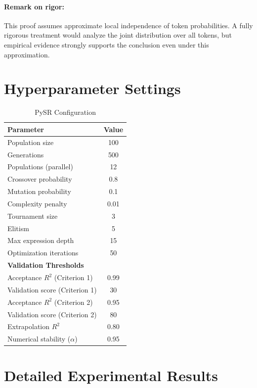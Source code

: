 \paragraph{Remark on rigor:} This proof assumes approximate local independence of token probabilities. A fully rigorous treatment would analyze the joint distribution over all tokens, but empirical evidence strongly supports the conclusion even under this approximation.

\section{Hyperparameter Settings}
\label{app:hyperparameters}

\begin{table}[H]
\centering
\caption{PySR Configuration}
\label{tab:hyperparameters}
\begin{tabular}{@{}lc@{}}
\toprule
\textbf{Parameter} & \textbf{Value} \\
\midrule
Population size & 100 \\
Generations & 500 \\
Populations (parallel) & 12 \\
Crossover probability & 0.8 \\
Mutation probability & 0.1 \\
Complexity penalty & 0.01 \\
Tournament size & 3 \\
Elitism & 5 \\
Max expression depth & 15 \\
Optimization iterations & 50 \\
\midrule
\textbf{Validation Thresholds} & \\
\midrule
Acceptance $R^2$ (Criterion 1) & 0.99 \\
Validation score (Criterion 1) & 30 \\
Acceptance $R^2$ (Criterion 2) & 0.95 \\
Validation score (Criterion 2) & 80 \\
Extrapolation $R^2$ & 0.80 \\
Numerical stability ($\alpha$) & 0.95 \\
\bottomrule
\end{tabular}
\end{table}

\section{Detailed Experimental Results}
\label{app:detailed_results}

